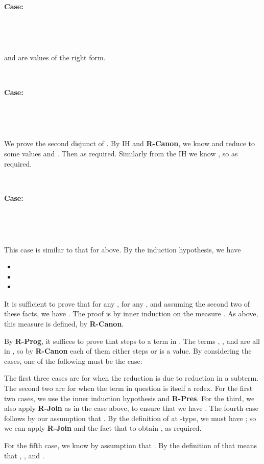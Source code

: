 \documentclass[copyright]{eptcs}
\begin{document}
\ 

\noindent \textbf{Case:}

\



\ 

\noindent  and  are values of the right form.

\ 

\noindent \textbf{Case:}

\



\ 

\noindent We prove the second disjunct of . 
By IH and \textbf{R-Canon}, we know   and 
reduce to some values  and . Then  as required. Similarly
from the IH we know , so  as required.

\

\noindent \textbf{Case:}

\



\ 

\noindent This case is similar to that for  above. By the induction hypothesis, we have
\begin{itemize}
\item 
\item 
\item 
\end{itemize}

\noindent It is sufficient to prove that for any , for any
, and assuming the
second two of these facts, we have . The proof is by inner
induction on the measure .
As above, this measure is defined, by \textbf{R-Canon}. 

By \textbf{R-Prog}, it suffices to prove that  steps to a term in .  The
terms , , and  are all in  , 
so by \textbf{R-Canon} each of them either steps or is a value. By
considering the cases, one of the following must be the case:



\noindent The first three cases are for when the reduction is due to
reduction in a subterm.  The second two are for when the term in
question is itself a redex.  For the first two cases, we use the inner
induction hypothesis and \textbf{R-Pres}.  For the third, we also
apply \textbf{R-Join} as in the  case above, to ensure that we
have .  The fourth
case follows by our assumption that .  By the definition of
 at -type, we must have ; so we can
apply \textbf{R-Join} and the fact that  to obtain
, as required.

For the fifth case, we know by assumption that .  By the definition of
 that means that , , and .
\end{document}
